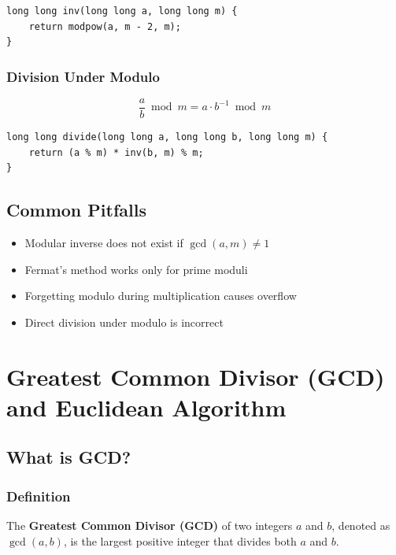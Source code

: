 \documentclass[11pt]{article}
\begin{document}
\begin{lstlisting}
long long inv(long long a, long long m) {
    return modpow(a, m - 2, m);
}
\end{lstlisting}

\subsubsection{Division Under Modulo}

\[
\frac{a}{b} \bmod m = a \cdot b^{-1} \bmod m
\]

\begin{lstlisting}
long long divide(long long a, long long b, long long m) {
    return (a % m) * inv(b, m) % m;
}
\end{lstlisting}


\subsection{Common Pitfalls}

\begin{itemize}
    \item Modular inverse does not exist if $\gcd(a, m) \neq 1$
    \item Fermat's method works only for prime moduli
    \item Forgetting modulo during multiplication causes overflow
    \item Direct division under modulo is incorrect
\end{itemize}

\section{Greatest Common Divisor (GCD) and Euclidean Algorithm}

\subsection{What is GCD?}

\subsubsection{Definition}
The \textbf{Greatest Common Divisor (GCD)} of two integers $a$ and $b$,
denoted as $\gcd(a, b)$, is the largest positive integer that divides both
$a$ and $b$.
\end{document}
